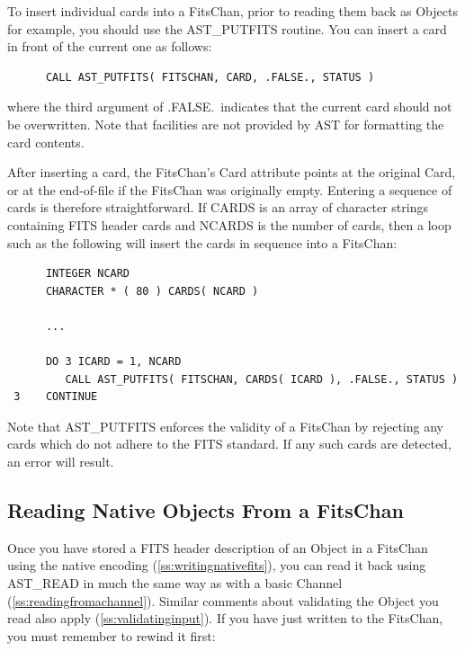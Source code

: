 \documentclass[twoside,11pt]{article}
\newcommand{\htmlref}[2]{#1}
\newcommand{\secref}[1]{\S\ref{#1}}
\renewcommand{\secref}[1]{\ref{#1}}
\begin{document}
To insert individual cards into a \htmlref{FitsChan}{FitsChan}, prior to reading them back
as Objects for example, you should use the \htmlref{AST\_PUTFITS}{AST_PUTFITS} routine. You
can insert a card in front of the current one as follows:

\small
\begin{verbatim}
      CALL AST_PUTFITS( FITSCHAN, CARD, .FALSE., STATUS )
\end{verbatim}
\normalsize

where the third argument of .FALSE.\ indicates that the current card
should not be overwritten. Note that facilities are not provided by
AST for formatting the card contents.

After inserting a card, the FitsChan's \htmlref{Card}{Card} attribute points at the
original Card, or at the end-of-file if the FitsChan was originally
empty. Entering a sequence of cards is therefore straightforward. If
CARDS is an array of character strings containing FITS header cards
and NCARDS is the number of cards, then a loop such as the following
will insert the cards in sequence into a FitsChan:

\small
\begin{verbatim}
      INTEGER NCARD
      CHARACTER * ( 80 ) CARDS( NCARD )

      ...

      DO 3 ICARD = 1, NCARD
         CALL AST_PUTFITS( FITSCHAN, CARDS( ICARD ), .FALSE., STATUS )
 3    CONTINUE
\end{verbatim}
\normalsize


Note that AST\_PUTFITS enforces the validity of a FitsChan by
rejecting any cards which do not adhere to the FITS standard. If any
such cards are detected, an error will result.

\subsection{\label{ss:readingnativefits}Reading Native Objects From a FitsChan}

Once you have stored a FITS header description of an \htmlref{Object}{Object} in a
\htmlref{FitsChan}{FitsChan} using the native encoding (\secref{ss:writingnativefits}),
you can read it back using \htmlref{AST\_READ}{AST_READ} in much the same way as with a
basic \htmlref{Channel}{Channel} (\secref{ss:readingfromachannel}). Similar comments
about validating the Object you read also apply
(\secref{ss:validatinginput}).  If you have just written to the
FitsChan, you must remember to rewind it first:
\end{document}

